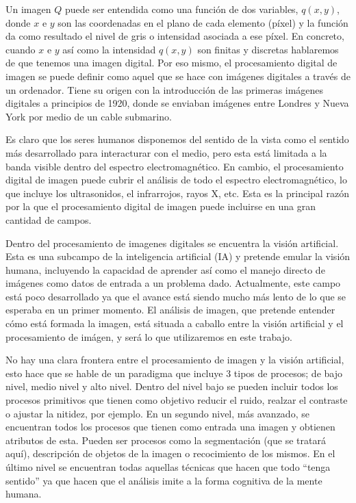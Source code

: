 Un imagen $Q$ puede ser entendida como una función de dos variables, $q(x,y)$, donde $x$ e $y$ son las coordenadas en el plano de cada elemento (píxel) y la función da como resultado el nivel de gris o intensidad asociada a ese píxel. En concreto, cuando $x$ e $y$ así como la intensidad $q(x,y)$ son finitas y discretas hablaremos de que tenemos una imagen digital. Por eso mismo, el procesamiento digital de imagen se puede definir como aquel que se hace con imágenes digitales a través de un ordenador. Tiene su origen con la introducción de las primeras imágenes digitales a principios de 1920, donde se enviaban imágenes entre Londres y Nueva York por medio de un cable submarino.

Es claro que los seres humanos disponemos del sentido de la vista como el sentido más desarrollado para interacturar con el medio, pero esta está limitada a la banda visible dentro del espectro electromagnético. En cambio, el procesamiento digital de imagen puede cubrir el análisis de todo el espectro electromagnético, lo que incluye los ultrasonidos, el infrarrojos, rayos X, etc. Esta es la principal razón por la que el procesamiento digital de imagen puede incluirse en una gran cantidad de campos.

Dentro del procesamiento de imagenes digitales se encuentra la visión artificial. Esta es una subcampo de la inteligencia artificial (IA) y pretende emular la visión humana, incluyendo la capacidad de aprender así como el manejo directo de imágenes como datos de entrada a un problema dado. Actualmente, este campo está poco desarrollado \cite{lib:gonzalez} ya que el avance está siendo mucho más lento de lo que se esperaba en un primer momento. El análisis de imagen, que pretende entender cómo está formada la imagen, está situada a caballo entre la visión artificial y el procesamiento de imágen, y será lo que utilizaremos en este trabajo.

No hay una clara frontera entre el procesamiento de imagen y la visión artificial, esto hace que se hable de un paradigma que incluye 3 tipos de procesos; de bajo nivel, medio nivel y alto nivel. Dentro del nivel bajo se pueden incluir todos los procesos primitivos que tienen como objetivo reducir el ruido, realzar el contraste o ajustar la nitidez, por ejemplo. En un segundo nivel, más avanzado, se encuentran todos los procesos que tienen como entrada una imagen y obtienen atributos de esta. Pueden ser procesos como la segmentación (que se tratará aquí), descripción de objetos de la imagen o recocimiento de los mismos. En el último nivel se encuentran todas aquellas técnicas que hacen que todo ``tenga sentido'' ya que hacen que el análisis imite a la forma cognitiva de la mente humana.


